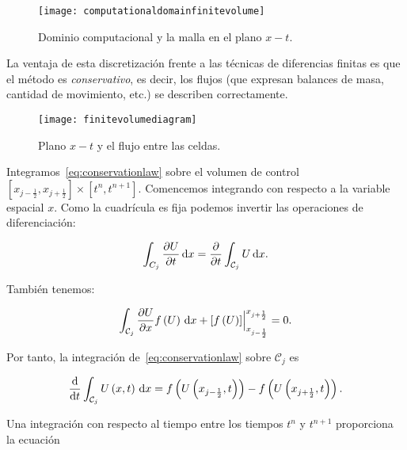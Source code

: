 \begin{frame}
	\begin{figure}[ht!]
		\centering
		\texttt{[image: computationaldomainfinitevolume]}
		\caption{Dominio computacional y la malla en el plano $x-t$.}
		\label{fig:computationaldomainfinitevolume}
	\end{figure}

	La ventaja de esta discretización frente a las técnicas de
	diferencias finitas es que el método es \emph{conservativo}, es
	decir, los flujos (que expresan balances de masa, cantidad de
	movimiento, etc.) se describen correctamente.

	\begin{figure}[ht!]
		\centering
		\texttt{[image: finitevolumediagram]}
		\label{fig:finitevolumediagram}
		\caption{Plano $x-t$ y el flujo entre las celdas.}
	\end{figure}

	Integramos~\eqref{eq:conservationlaw} sobre el volumen de control
	\begin{math}
		\left[
			x_{j-\frac{1}{2}},
			x_{j+\frac{1}{2}}
			\right]\times
		\left[
			t^{n},
			t^{n+1}
			\right]
	\end{math}.
	Comencemos integrando con respecto a la variable espacial $x$.
	Como la cuadrícula es fija podemos invertir las operaciones de
	diferenciación:

	\begin{equation*}
		\int_{C_{j}}
		\diffp{U}{t}
		\dl x=
		\diffp{}{t}
		\int_{\mathcal{C}_{j}}
		U\dl x.
	\end{equation*}

	También tenemos:

	\begin{equation*}
		\int_{\mathcal{C}_{j}}
		\diffp{U}{x}
		f\left(U\right)
		\dl x+
		{
		\left[
			f\left(U\right)
			\right]
		\Bigr|
		}_{x_{j-\frac{1}{2}}}^{x_{j+\frac{1}{2}}}
		=0.
	\end{equation*}

	Por tanto, la integración de~\eqref{eq:conservationlaw} sobre
	$\mathcal{C}_{j}$ es

	\begin{equation*}
		\diff{}{t}
		\int_{\mathcal{C}_{j}}
		U\left(x,t\right)
		\dl x=
		f\left(U\left(x_{j-\frac{1}{2}},t\right)\right)-
		f\left(U\left(x_{j+\frac{1}{2}},t\right)\right).
	\end{equation*}

	Una integración con respecto al tiempo entre los tiempos $t^{n}$ y
	$t^{n+1}$ proporciona la ecuación


\end{frame}
